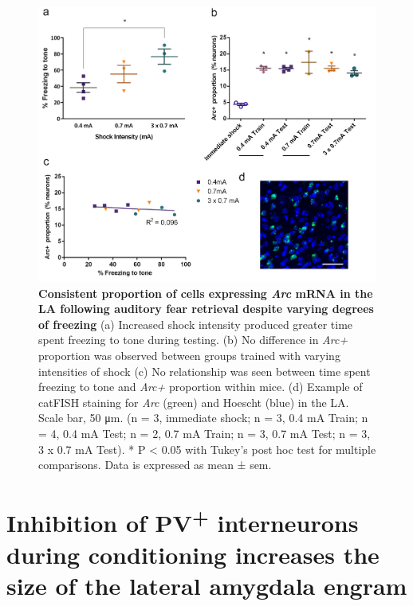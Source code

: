 \documentclass[12pt,a4paperpaper,]{report}
\begin{document}
\begin{figure}[htbp]
\centering
\includegraphics{source/figures/figure_3.jpg}
\caption{\textbf{Consistent proportion of cells expressing \emph{Arc}
mRNA in the LA following auditory fear retrieval despite varying degrees
of freezing} (a) Increased shock intensity produced greater time spent
freezing to tone during testing. (b) No difference in \emph{Arc+}
proportion was observed between groups trained with varying intensities
of shock (c) No relationship was seen between time spent freezing to
tone and \emph{Arc+} proportion within mice. (d) Example of catFISH
staining for \emph{Arc} (green) and Hoescht (blue) in the LA. Scale bar,
50 μm. (n = 3, immediate shock; n = 3, 0.4 mA Train; n = 4, 0.4 mA Test;
n = 2, 0.7 mA Train; n = 3, 0.7 mA Test; n = 3, 3 x 0.7 mA Test). * P
\textless{} 0.05 with Tukey's post hoc test for multiple comparisons.
Data is expressed as mean ± sem. \label{ref_a_figure}}
\end{figure}

\section{\texorpdfstring{Inhibition of PV\textsuperscript{+}
interneurons during conditioning increases the size of the lateral
amygdala
engram}{Inhibition of PV+ interneurons during conditioning increases the size of the lateral amygdala engram}}\label{inhibition-of-pv-interneurons-during-conditioning-increases-the-size-of-the-lateral-amygdala-engram}
\end{document}
